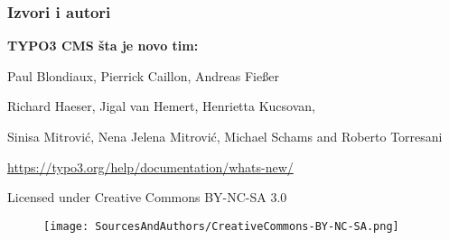 
\begin{frame}[fragile]
	\frametitle{Izvori i autori}

	\vspace{-0.6cm}

	\centerline{\textbf{TYPO3 CMS šta je novo tim:}}

	\begin{center}
		\centerline{Paul Blondiaux, Pierrick Caillon, Andreas Fießer}
		\centerline{Richard Haeser, Jigal van Hemert, Henrietta Kucsovan,}
		\centerline{ Sinisa Mitrović, Nena Jelena Mitrović, Michael Schams and Roberto Torresani}
	\end{center}

	\vspace{0.6cm}

	\smaller\begin{center}\url{https://typo3.org/help/documentation/whats-new/}\end{center}\normalsize

	\vspace{1cm}

	\smaller\begin{center}Licensed under Creative Commons BY-NC-SA 3.0\end{center}\normalsize
	\begin{figure}\vspace*{-0.4cm}
		\texttt{[image: SourcesAndAuthors/CreativeCommons-BY-NC-SA.png]}
	\end{figure}

\end{frame}

